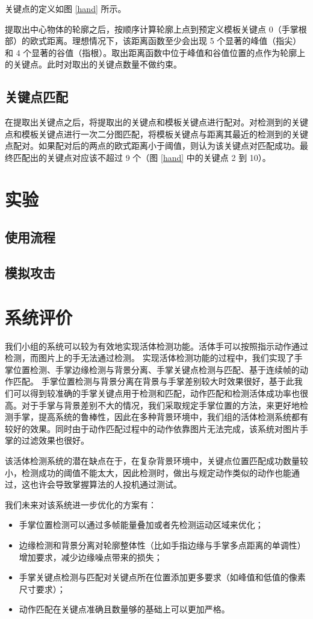 \documentclass[UTF8, a4paper, fontset=none]{article}
\begin{document}
关键点的定义如图 \ref{hand} 所示。

提取出中心物体的轮廓之后，按顺序计算轮廓上点到预定义模板关键点 0（手掌根部）的欧式距离。理想情况下，该距离函数至少会出现 5 个显著的峰值（指尖）和 4 个显著的谷值（指根）。取出距离函数中位于峰值和谷值位置的点作为轮廓上的关键点。此时对取出的关键点数量不做约束。

\subsection{关键点匹配}

在提取出关键点之后，将提取出的关键点和模板关键点进行配对。对检测到的关键点和模板关键点进行一次二分图匹配，将模板关键点与距离其最近的检测到的关键点配对。如果配对后的两点的欧式距离小于阈值，则认为该关键点对匹配成功。最终匹配出的关键点对应该不超过 9 个（图 \ref{hand} 中的关键点 2 到 10）。

\section{实验}

    \subsection{使用流程}

    \subsection{模拟攻击}

\section{系统评价}

我们小组的系统可以较为有效地实现活体检测功能。活体手可以按照指示动作通过检测，而图片上的手无法通过检测。
实现活体检测功能的过程中，我们实现了手掌位置检测、手掌边缘检测与背景分离、手掌关键点检测与匹配、基于连续帧的动作匹配。
手掌位置检测与背景分离在背景与手掌差别较大时效果很好，基于此我们可以得到较准确的手掌关键点用于检测和匹配，动作匹配和检测活体成功率也很高。对于手掌与背景差别不大的情况，我们采取规定手掌位置的方法，来更好地检测手掌，提高系统的鲁棒性，因此在多种背景环境中，我们组的活体检测系统都有较好的效果。同时由于动作匹配过程中的动作依靠图片无法完成，该系统对图片手掌的过滤效果也很好。

该活体检测系统的潜在缺点在于，在复杂背景环境中，关键点位置匹配成功数量较小，检测成功的阈值不能太大，因此检测时，做出与规定动作类似的动作也能通过，这也许会导致掌握算法的人投机通过测试。

我们未来对该系统进一步优化的方案有：
\begin{itemize}
  \item 手掌位置检测可以通过多帧能量叠加或者先检测运动区域来优化；
  \item 边缘检测和背景分离对轮廓整体性（比如手指边缘与手掌多点距离的单调性）增加要求，减少边缘噪点带来的损失；
  \item 手掌关键点检测与匹配对关键点所在位置添加更多要求（如峰值和低值的像素尺寸要求）；
  \item 动作匹配在关键点准确且数量够的基础上可以更加严格。
\end{itemize}
\end{document}
